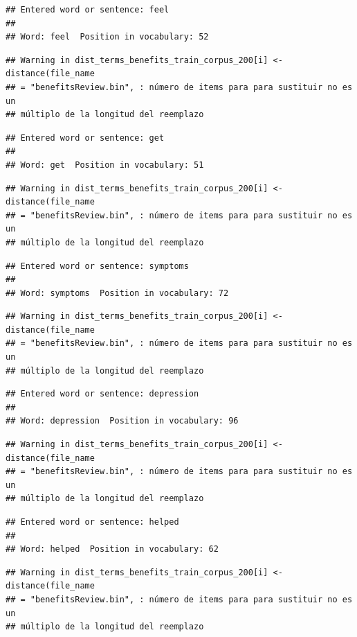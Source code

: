 \documentclass[spanish,]{article}
\begin{document}
\begin{verbatim}
## Entered word or sentence: feel
## 
## Word: feel  Position in vocabulary: 52
\end{verbatim}

\begin{verbatim}
## Warning in dist_terms_benefits_train_corpus_200[i] <- distance(file_name
## = "benefitsReview.bin", : número de items para para sustituir no es un
## múltiplo de la longitud del reemplazo
\end{verbatim}

\begin{verbatim}
## Entered word or sentence: get
## 
## Word: get  Position in vocabulary: 51
\end{verbatim}

\begin{verbatim}
## Warning in dist_terms_benefits_train_corpus_200[i] <- distance(file_name
## = "benefitsReview.bin", : número de items para para sustituir no es un
## múltiplo de la longitud del reemplazo
\end{verbatim}

\begin{verbatim}
## Entered word or sentence: symptoms
## 
## Word: symptoms  Position in vocabulary: 72
\end{verbatim}

\begin{verbatim}
## Warning in dist_terms_benefits_train_corpus_200[i] <- distance(file_name
## = "benefitsReview.bin", : número de items para para sustituir no es un
## múltiplo de la longitud del reemplazo
\end{verbatim}

\begin{verbatim}
## Entered word or sentence: depression
## 
## Word: depression  Position in vocabulary: 96
\end{verbatim}

\begin{verbatim}
## Warning in dist_terms_benefits_train_corpus_200[i] <- distance(file_name
## = "benefitsReview.bin", : número de items para para sustituir no es un
## múltiplo de la longitud del reemplazo
\end{verbatim}

\begin{verbatim}
## Entered word or sentence: helped
## 
## Word: helped  Position in vocabulary: 62
\end{verbatim}

\begin{verbatim}
## Warning in dist_terms_benefits_train_corpus_200[i] <- distance(file_name
## = "benefitsReview.bin", : número de items para para sustituir no es un
## múltiplo de la longitud del reemplazo
\end{verbatim}
\end{document}
